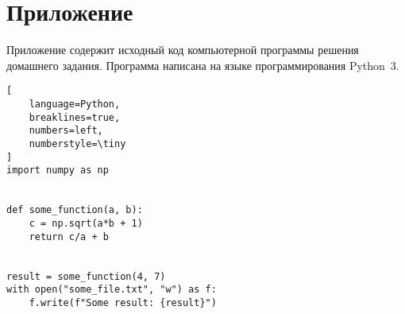 \documentclass[../homework.tex]{subfiles}
\begin{document}
\newpage

\section{Приложение}

Приложение содержит исходный код компьютерной программы решения домашнего задания.
Программа написана на языке программирования Python~3.

\footnotesize

\begin{lstlisting}[
    language=Python,
    breaklines=true,
    numbers=left,
    numberstyle=\tiny
]
import numpy as np


def some_function(a, b):
    c = np.sqrt(a*b + 1)
    return c/a + b


result = some_function(4, 7)
with open("some_file.txt", "w") as f:
    f.write(f"Some result: {result}")

\end{lstlisting}
\end{document}
